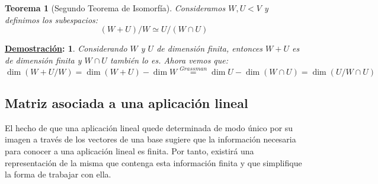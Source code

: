 \documentclass[10pt,a4paper,openright]{book}
\theoremstyle{break}
\newtheorem*{theo}{Teorema}
\newtheorem*{demo}{\underline{Demostración}:}
\begin{document}
\begin{theo}[Segundo Teorema de Isomorfía]
Consideramos $W, U<V$ y definimos los subespacios:
$$(W+U)/W\simeq U/(W\cap U)$$
\end{theo}
\begin{demo}
Considerando $W$ y $U$ de dimensión finita, entonces $W+U$ es de dimensión finita y $W\cap U$ también lo es. Ahora vemos que:
$$\dim (W+U/W)=\dim (W+U)- \dim W\stackrel{Grassman}{=}\dim U-\dim (W\cap U)=\dim (U/W\cap U)$$
\end{demo}

\subsection{Matriz asociada a una aplicación lineal}
El hecho de que una aplicación lineal quede determinada de modo único por su imagen a través de los vectores de una base sugiere que la información necesaria para conocer a una aplicación lineal es finita. Por tanto, existirá una representación de la misma que contenga esta información finita y que simplifique la forma de trabajar con ella.
\end{document}
